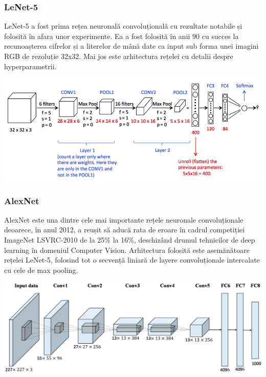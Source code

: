\subsubsection{LeNet-5}
LeNet-5 a fost prima rețea neuronală convoluțională cu rezultate notabile și folosită în afara unor experimente. Ea a fost folosită în anii 90 cu succes la recunoașterea cifrelor și a literelor de mână date ca input sub forma unei imagini RGB de rezoluție 32x32. Mai jos este arhitectura rețelei cu detalii despre hyperparametrii. \cite{lenet}

\begin{center}
\includegraphics[scale=0.5]{LeNet5}
\end{center}

\subsubsection{AlexNet}
AlexNet este una dintre cele mai importante rețele neuronale convoluționale deoarece, în anul 2012, a reușit să aducă rata de eroare în cadrul competiției ImageNet LSVRC-2010 de la 25\% la 16\%, deschizând drumul tehnicilor de deep learning în domeniul Computer Vision. Arhitectura folosită este asemănătoare rețelei LeNet-5, folosind tot o secvență liniară de layere convoluționale intercalate cu cele de max pooling. \cite{alexnet}

\begin{center}
\includegraphics[scale=1.5]{alexnet}
\end{center}

